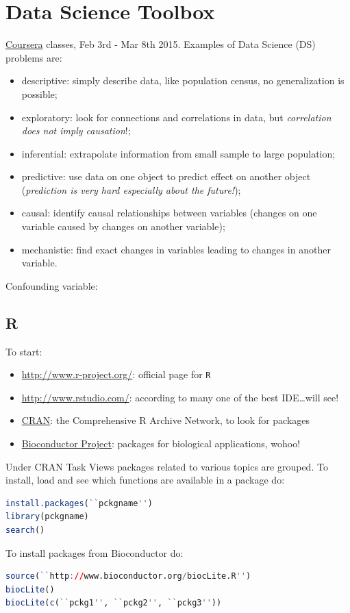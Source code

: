 \chapter{Data Science Toolbox}

\href{https://www.coursera.org/course/datascitoolbox}{Coursera} classes, Feb 3rd - Mar 8th 2015. 
Examples of Data Science (DS) problems are:
\begin{itemize}
\item descriptive: simply describe data, like population census, no generalization is possible;
\item exploratory: look for connections and correlations in data, but {\it correlation does not imply causation}!;
\item inferential: extrapolate information from small sample to large population;
\item predictive: use data on one object to predict effect on another object ({\it prediction is very hard especially about the future!});
\item causal: identify causal relationships between variables (changes on one variable caused by changes on another variable);
\item mechanistic: find exact changes in variables leading to changes in another variable.
\end{itemize}

Confounding variable:




\section{R}

To start:
\begin{itemize}
\item \url{http://www.r-project.org/}: official page for \texttt{R}
\item \url{http://www.rstudio.com/}: according to many one of the best IDE\dots will see!
\item \href{http://cran.r-project.org/}{CRAN}: the Comprehensive R Archive Network, to look for packages
\item \href{http://www.bioconductor.org/}{Bioconductor Project}: packages for biological applications, wohoo!
\end{itemize}
Under CRAN Task Views packages related to various topics are grouped.
To install, load and see which functions are available in a package do:
\begin{lstlisting}[language=R]
install.packages(``pckgname'')
library(pckgname)
search()
\end{lstlisting}
To install packages from Bioconductor do:
\begin{lstlisting}[language=R]
source(``http://www.bioconductor.org/biocLite.R'')
biocLite()
biocLite(c(``pckg1'', ``pckg2'', ``pckg3''))
\end{lstlisting}

